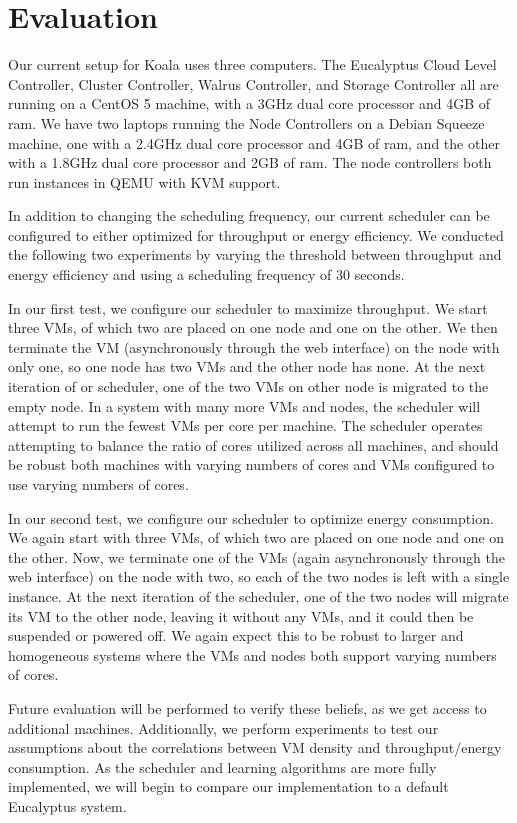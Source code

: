 \section{Evaluation}

Our current setup for Koala uses three computers.  The Eucalyptus Cloud Level Controller, Cluster Controller, Walrus Controller, and Storage Controller all are running on a CentOS 5 machine, with a 3GHz dual core processor and 4GB of ram.  We have two laptops running the Node Controllers on a Debian Squeeze machine, one with a 2.4GHz dual core processor and 4GB of ram, and the other with a 1.8GHz dual core processor and 2GB of ram.  The node controllers both run instances in QEMU with KVM support.  

In addition to changing the scheduling frequency, our current scheduler can be configured to either optimized for throughput or energy efficiency.  We conducted the following two experiments by varying the threshold between throughput and energy efficiency and using a scheduling frequency of 30 seconds.

In our first test, we configure our scheduler to maximize throughput.  We start three VMs, of which two are placed on one node and one on the other.  We then terminate the VM (asynchronously through the web interface) on the node with only one, so one node has two VMs and the other node has none.  At the next iteration of or scheduler, one of the two VMs on other node is migrated to the empty node.  In a system with many more VMs and nodes, the scheduler will attempt to run the fewest VMs per core per machine.  The scheduler operates attempting to balance the ratio of cores utilized across all machines, and should be robust both machines with varying numbers of cores and VMs configured to use varying numbers of cores.

In our second test, we configure our scheduler to optimize energy consumption.  We again start with three VMs, of which two are placed on one node and one on the other.  Now, we terminate one of the VMs (again asynchronously through the web interface) on the node with two, so each of the two nodes is left with a single instance.  At the next iteration of the scheduler, one of the two nodes will migrate its VM to the other node, leaving it without any VMs, and it could then be suspended or powered off.  We again expect this to be robust to larger and homogeneous systems where the VMs and nodes both support varying numbers of cores.

Future evaluation will be performed to verify these beliefs, as we get access to additional machines.  Additionally, we perform experiments to test our assumptions about the correlations between VM density and throughput/energy consumption.  As the scheduler and learning algorithms are more fully implemented, we will begin to compare our implementation to a default Eucalyptus system.